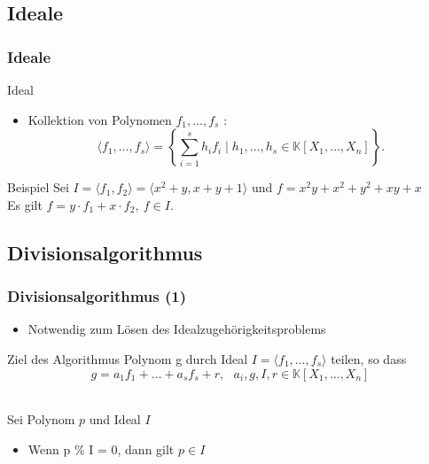\documentclass{beamer}
\begin{document}
\subsection{Ideale}

\begin{frame}[fragile]
\frametitle{Ideale}

\begin{block}{Ideal }
\begin{itemize}
\item Kollektion von Polynomen $f_{1}, \dots , f_{s}$ : \\
\[ \langle f_{1}, \dots , f_{s} \rangle = \left\lbrace  \sum_{i=1}^s h_{i}f_{i} \mid h_{1}, \dots , h_{s} \in \mathbb{K}\left[X_{1}, \dots, X_{n}\right] \right\rbrace. \] 
 
\end{itemize}

\end{block}

\begin{block}{Beispiel}
Sei $ I= \langle f_{1},f_{2} \rangle = \langle x^{2}+y, x+y+1 \rangle $ und $f=x^{2}y+x^{2}+y^{2}+xy+x$ \\
Es gilt $f= y \cdot f_{1} + x \cdot f_{2},~f\in I$.

\end{block}


\end{frame}
\subsection{Divisionsalgorithmus}
\begin{frame}
\frametitle{Divisionsalgorithmus (1)}



\begin{itemize}
\item Notwendig zum Lösen des Idealzugehörigkeitsproblems


\end{itemize}

\begin{block}{Ziel des Algorithmus}
Polynom g durch Ideal $ I = \langle f_{1}, \dots , f_{s} \rangle  $ teilen, so dass 
\[ g = a_{1}f_{1} + \ldots + a_{s}f_{s} + r ,~~~ a_{i},g,I,r \in \mathbb{K}\left[X_{1}, \dots, X_{n}\right]  \]
\end{block}

~\\

Sei Polynom $p$ und Ideal $I$  

\begin{itemize}
\item Wenn p \% I = 0, dann gilt $ p \in I$


\end{itemize}



	
\end{frame}
\end{document}
